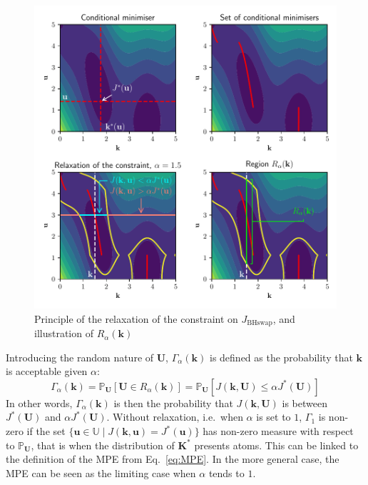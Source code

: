 \documentclass[preprint, 1p]{elsarticle}
\newcommand{\Prob}{\mathbb{P}}
\newcommand{\Uspace}{\mathbb{U}}
\begin{document}
\begin{figure}[!t]
\centering
\includegraphics[width=12cm]{Figures/relaxation_tuto.pdf}
\caption{Principle of the relaxation of the constraint on $J_{\mathrm{BHswap}}$, and illustration of $R_\alpha(\mathbf{k})$}
\label{fig:relax_tuto}
\end{figure}

Introducing the random nature of $\mathbf{U}$, $\Gamma_\alpha(\mathbf{k})$ is defined as the probability that $\mathbf{k}$ is acceptable given $\alpha$:
\begin{equation}
  \label{eq:def_Gamma}
  \Gamma_\alpha(\mathbf{k}) = \Prob_{\mathbf{U}}\left[\mathbf{U} \in R_\alpha(\mathbf{k})\right] = \Prob_{\mathbf{U}}\left[J(\mathbf{k},\mathbf{U}) \leq 
    \alpha J^*(\mathbf{U}) \right]
\end{equation}
In other words, $\Gamma_{\alpha}(\mathbf{k})$ is then the probability that $J(\mathbf{k},\mathbf{U})$ is between 
$J^*(\mathbf{U})$ and 
$\alpha J^*(\mathbf{U})$. Without relaxation, i.e.\ when $\alpha$ is set to $1$, $\Gamma_1$ is non-zero if the set $\{\mathbf{u}\in\Uspace \mid J(\mathbf{k},\mathbf{u}) = J^*(\mathbf{u})\}$ has non-zero measure with respect to $\Prob_{\mathbf{U}}$, that is when the distribution of $\mathbf{K}^*$ presents atoms. This can be linked to the definition of the MPE from Eq.~\eqref{eq:MPE}. In the more general case, the MPE can be seen as the limiting case when $\alpha$ tends to $1$.
\end{document}
